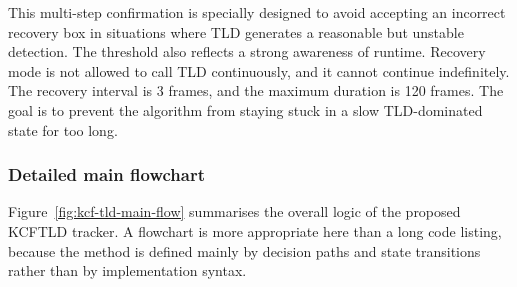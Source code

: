 \documentclass[12pt,a4paper]{article}
\begin{document}
This multi-step confirmation is specially designed to avoid accepting an incorrect recovery box in situations where TLD generates a reasonable but unstable detection. The threshold also reflects a strong awareness of runtime. Recovery mode is not allowed to call TLD continuously, and it cannot continue indefinitely. The recovery interval is 3 frames, and the maximum duration is 120 frames. The goal is to prevent the algorithm from staying stuck in a slow TLD-dominated state for too long.

\subsubsection{Detailed main flowchart}
Figure~\ref{fig:kcf-tld-main-flow} summarises the overall logic of the proposed KCF\textendash TLD tracker. A flowchart is more appropriate here than a long code listing, because the method is defined mainly by decision paths and state transitions rather than by implementation syntax.
\end{document}
